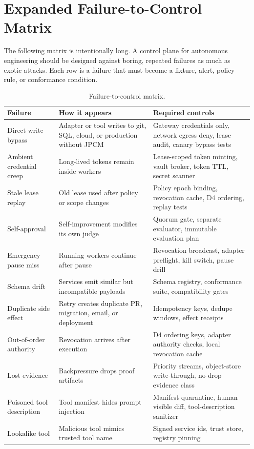 \documentclass[journal,onecolumn]{IEEEtran}
\begin{document}
\section{Expanded Failure-to-Control Matrix}
The following matrix is intentionally long. A control plane for autonomous engineering should be designed against boring, repeated failures as much as exotic attacks. Each row is a failure that must become a fixture, alert, policy rule, or conformance condition.

\begin{longtable}{p{}p{}p{}}
\caption{Failure-to-control matrix.}\\
\toprule
Failure & How it appears & Required controls\\
\midrule
Direct write bypass & Adapter or tool writes to git, SQL, cloud, or production without JPCM & Gateway credentials only, network egress deny, lease audit, canary bypass tests\\
Ambient credential creep & Long-lived tokens remain inside workers & Lease-scoped token minting, vault broker, token TTL, secret scanner\\
Stale lease replay & Old lease used after policy or scope changes & Policy epoch binding, revocation cache, D4 ordering, replay tests\\
Self-approval & Self-improvement modifies its own judge & Quorum gate, separate evaluator, immutable evaluation plan\\
Emergency pause miss & Running workers continue after pause & Revocation broadcast, adapter preflight, kill switch, pause drill\\
Schema drift & Services emit similar but incompatible payloads & Schema registry, conformance suite, compatibility gates\\
Duplicate side effect & Retry creates duplicate PR, migration, email, or deployment & Idempotency keys, dedupe windows, effect receipts\\
Out-of-order authority & Revocation arrives after execution & D4 ordering keys, adapter authority checks, local revocation cache\\
Lost evidence & Backpressure drops proof artifacts & Priority streams, object-store write-through, no-drop evidence class\\
Poisoned tool description & Tool manifest hides prompt injection & Manifest quarantine, human-visible diff, tool-description sanitizer\\
Lookalike tool & Malicious tool mimics trusted tool name & Signed service ids, trust store, registry pinning\\

\end{longtable}
\end{document}
